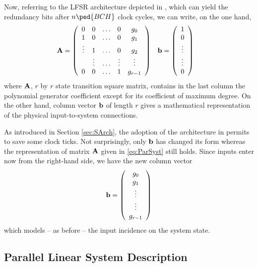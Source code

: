 Now, referring to the LFSR architecture depicted in , which can yield the redundancy bits after $n\ped{BCH}$ clock cycles, we can write, on the one hand,
\begin{align}
\mathbf{A} & = \left (
\begin{array} {ccccc}
0      &  0     & \ldots &  0     & g_0\\
1      &  0     & \ldots & 0      & g_1\\
\vdots &  1     & \ldots &   0    & g_2\\
       & \vdots & \ldots & \vdots & \vdots\\
0      & 0      & \ldots & 1      & g_{r-1} \\
\end{array} \right ) &
\mathbf{b} & = \left(
\begin{array}{c}
  1 \\
  0 \\
   \vdots \\
    \vdots \\
    0\\
\end{array} \right) \label{eq:ParSyst}
\end{align}
where $\mathbf{A}$, $r$ by $r$ state transition square matrix, contains in the last column the polynomial generator coefficient except for its coefficient of maximum degree. On the other hand, column vector $\mathbf{b}$ of length $r$ gives a mathematical representation of the physical input-to-system connections.

As introduced in Section \ref{sec:SArch}, the adoption of the architecture in  permits to save some clock ticks. Not surprisingly, only $\mathbf{b} $ has changed its form whereas the representation of matrix $\mathbf{A}$ given in \eqref{eq:ParSyst} still holds. Since inputs enter now from the right-hand side, we have the new column vector
\begin{equation}\label{eq:vetb}
\mathbf{b} =
\left(
\begin{array}{c}
  g_0 \\
  g_1 \\
   \vdots \\
    \vdots \\
    g_{r-1}\\
\end{array}
\right)
\end{equation}
which models -- as before -- the input incidence on the system state.


\subsection{Parallel Linear System Description}

